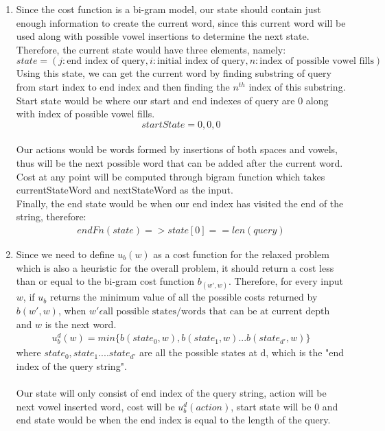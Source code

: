 \documentclass[12pt]{article}
\begin{document}
\begin{enumerate}[label=(\alph*)]
	\item Since the cost function is a bi-gram model, our state should contain just enough information to create the current word, since this current word will be used along with possible vowel insertions to determine the next state. Therefore, the current state would have three elements, namely: $$ state = (j: \text{end index of query}, i: \text{initial index of query}, n: \text{index of possible vowel fills})$$ Using this state, we can get the current word by finding substring of query from start index to end index and then finding the $n^{th}$ index of this substring. \\
	Start state would be where our start and end indexes of query are $0$ along with index of possible vowel fills. $$ startState = 0, 0, 0 $$ \\
	Our actions would be words formed by insertions of both spaces and vowels, thus will be the next possible word that can be added after the current word. Cost at any point will be computed through bigram function which takes currentStateWord and nextStateWord as the input. \\
	Finally, the end state would be when our end index has visited the end of the string, therefore:
	\begin{align*}
	endFn(state) => state[0] == len(query)
	\end{align*}
	\addtocounter{enumi}{1}
	\item Since we need to define $u_b(w)$ as a cost function for the relaxed problem which is also a heuristic for the overall problem, it should return a cost less than or equal to the bi-gram cost function $b_(w', w)$. Therefore, for every input $w$, if $u_b$ returns the minimum value of all the possible costs returned by $b(w', w)$, when $w' \epsilon \text{all possible states/words that can be at current depth}$ and $w$ is the next word.
	\begin{align*}
	u_{b}^d(w) = min \{b(state_0, w), b(state_1, w) ... b(state_{d'}, w)\}
	\end{align*}
	where $state_0, state_1 .... state_{d'}$ are all the possible states at d, which is the "end index of the query string". \\ \\
	Our state will only consist of end index of the query string, action will be next vowel inserted word, cost will be $u_{b}^d(action)$, start state will be 0 and end state would be when the end index is equal to the length of the query. \\

\end{enumerate}
\end{document}
